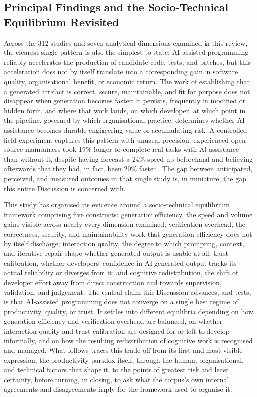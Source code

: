 \subsection*{Principal Findings and the Socio-Technical Equilibrium Revisited}
\label{sec:disc-synthesis}
Across the 312 studies and seven analytical dimensions examined in this review, the clearest single pattern is also the simplest to state: AI-assisted programming reliably accelerates the production of candidate code, tests, and patches, but this acceleration does not by itself translate into a corresponding gain in software quality, organisational benefit, or economic return. The work of establishing that a generated artefact is correct, secure, maintainable, and fit for purpose does not disappear when generation becomes faster; it persists, frequently in modified or hidden form, and where that work lands, on which developer, at which point in the pipeline, governed by which organisational practice, determines whether AI assistance becomes durable engineering value or accumulating risk. A controlled field experiment captures this pattern with unusual precision: experienced open-source maintainers took 19\% longer to complete real tasks with AI assistance than without it, despite having forecast a 24\% speed-up beforehand and believing afterwards that they had, in fact, been 20\% faster \cite{becker_measuring_2025}. The gap between anticipated, perceived, and measured outcomes in that single study is, in miniature, the gap this entire Discussion is concerned with.

This study has organised its evidence around a socio-technical equilibrium framework comprising five constructs: generation efficiency, the speed and volume gains visible across nearly every dimension examined; verification overhead, the correctness, security, and maintainability work that generation efficiency does not by itself discharge; interaction quality, the degree to which prompting, context, and iterative repair shape whether generated output is usable at all; trust calibration, whether developers' confidence in AI-generated output tracks its actual reliability or diverges from it; and cognitive redistribution, the shift of developer effort away from direct construction and towards supervision, validation, and judgement. The central claim this Discussion advances, and tests, is that AI-assisted programming does not converge on a single best regime of productivity, quality, or trust. It settles into different equilibria depending on how generation efficiency and verification overhead are balanced, on whether interaction quality and trust calibration are designed for or left to develop informally, and on how the resulting redistribution of cognitive work is recognised and managed. What follows traces this trade-off from its first and most visible expression, the productivity paradox itself, through the human, organisational, and technical factors that shape it, to the points of greatest risk and least certainty, before turning, in closing, to ask what the corpus's own internal agreements and disagreements imply for the framework used to organise it.

